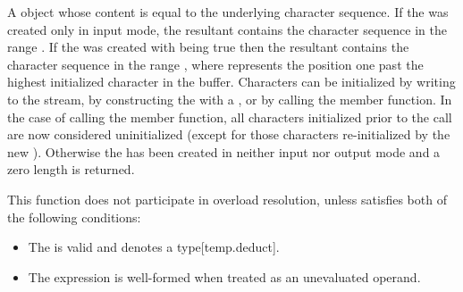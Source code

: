 \documentclass[ebook,11pt,article]{memoir}
\newcommand{\iref}[1]{[#1]}
\begin{document}
\begin{itemdescr}
\pnum
\returns
A
object whose content is equal to the
underlying character sequence.
If the  was created only in input mode, the resultant
 contains the character sequence in the range
. If the  was created with
 being true then the resultant 
contains the character sequence in the range , where
 represents the position one past the highest initialized character
in the buffer. Characters can be initialized by writing to the stream, by constructing
the  with a , or by calling 
the
 member function. In the case of calling 
the
 member function, all characters initialized prior to
the call are now considered uninitialized (except for those characters re-initialized
by the new ). Otherwise the  has been created
in neither input nor output mode and a zero length  is returned. 

\pnum %
\constraints 
This function does not participate in overload resolution, unless  satisfies both of the following conditions:

\begin{itemize}
\item The  
is valid and denotes a type\iref{temp.deduct}.

\item The expression 
is well-formed when treated as an unevaluated operand.
\end{itemize}

\end{itemdescr}
\end{document}
